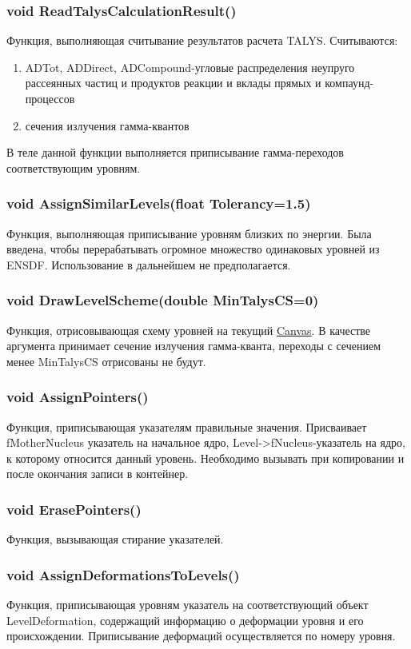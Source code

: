 \documentclass[a4paper,12pt]{extarticle}
\begin{document}
\subsubsection{void ReadTalysCalculationResult()}
Функция, выполняющая считывание результатов расчета TALYS. Считываются:
\begin{enumerate}
\item ADTot, ADDirect, ADCompound-угловые распределения неупруго рассеянных частиц и продуктов реакции и вклады прямых и компаунд-процессов
\item сечения излучения гамма-квантов
\end{enumerate} 
В теле данной функции выполняется приписывание гамма-переходов соответствующим уровням.
\subsubsection{void AssignSimilarLevels(float Tolerancy=1.5)}
Функция, выполняющая приписывание уровням близких по энергии. Была введена, чтобы перерабатывать огромное множество одинаковых уровней из ENSDF. Использование в дальнейшем не предполагается.
\subsubsection{void DrawLevelScheme(double MinTalysCS=0)}
Функция, отрисовывающая схему уровней на текущий \href{https://root.cern.ch/doc/master/classTCanvas.html}{Canvas}. В качестве аргумента принимает сечение излучения гамма-кванта, переходы с сечением менее MinTalysCS отрисованы не будут.
\subsubsection{void AssignPointers()}
Функция, приписывающая указателям правильные значения. Присваивает fMotherNucleus указатель на начальное ядро, Level->fNucleus-указатель на ядро, к которому относится данный уровень. Необходимо вызывать при копировании и после окончания записи в контейнер.
\subsubsection{void ErasePointers()}
Функция, вызывающая стирание указателей.
\subsubsection{void AssignDeformationsToLevels()}
Функция, приписывающая уровням указатель на соответствующий объект LevelDeformation, содержащий информацию о деформации уровня и его происхождении. Приписывание деформаций осуществляется по номеру уровня.
\end{document}
